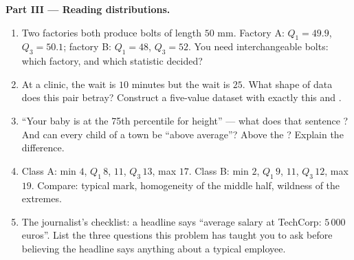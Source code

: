 \begin{problem}
\medskip
\noindent\textbf{Part III --- Reading distributions.}
\begin{enumerate}[resume]
  \item Two factories both produce bolts of  length
        $50$ mm. Factory A: $Q_1 = 49.9$, $Q_3 = 50.1$; factory
        B: $Q_1 = 48$, $Q_3 = 52$. You need interchangeable
        bolts: which factory, and which statistic decided?
  \item At a clinic, the  wait is $10$ minutes but the
         wait is $25$. What shape of data does this pair
        betray? Construct a five-value dataset with exactly this
         and .
  \item ``Your baby is at the 75th percentile for height'' ---
        what does that sentence ? And can every child of a
        town be ``above average''? Above the ? Explain the
        difference.
  \item Class A: min $4$, $Q_1\,8$,  $11$, $Q_3\,13$, max
        $17$. Class B: min $2$, $Q_1\,9$,  $11$, $Q_3\,12$,
        max $19$. Compare: typical mark, homogeneity of the
        middle half, wildness of the extremes.
  \item The journalist's checklist: a headline says ``average
        salary at TechCorp: $5\,000$ euros''. List the three
        questions this problem has taught you to ask before
        believing the headline says anything about a typical
        employee.
\end{enumerate}


\end{problem}
